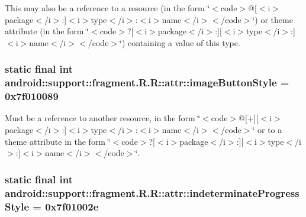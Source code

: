 This may also be a reference to a resource (in the form \char`\"{}$<$code$>$@\mbox{[}$<$i$>$package$<$/i$>$:\mbox{]}$<$i$>$type$<$/i$>$:$<$i$>$name$<$/i$>$$<$/code$>$\char`\"{}) or theme attribute (in the form \char`\"{}$<$code$>$?\mbox{[}$<$i$>$package$<$/i$>$:\mbox{]}\mbox{[}$<$i$>$type$<$/i$>$:\mbox{]}$<$i$>$name$<$/i$>$$<$/code$>$\char`\"{}) containing a value of this type. \hypertarget{classandroid_1_1support_1_1fragment_1_1_r_1_1attr_45008567ec4358acf7af16906e6ed9d3}{
\subsubsection[{imageButtonStyle}]{\setlength{\rightskip}{0pt plus 5cm}static final int android::support::fragment.R.R::attr::imageButtonStyle = 0x7f010089}}
\label{classandroid_1_1support_1_1fragment_1_1_r_1_1attr_45008567ec4358acf7af16906e6ed9d3}


Must be a reference to another resource, in the form \char`\"{}$<$code$>$@\mbox{[}+\mbox{]}\mbox{[}$<$i$>$package$<$/i$>$:\mbox{]}$<$i$>$type$<$/i$>$:$<$i$>$name$<$/i$>$$<$/code$>$\char`\"{} or to a theme attribute in the form \char`\"{}$<$code$>$?\mbox{[}$<$i$>$package$<$/i$>$:\mbox{]}\mbox{[}$<$i$>$type$<$/i$>$:\mbox{]}$<$i$>$name$<$/i$>$$<$/code$>$\char`\"{}. \hypertarget{classandroid_1_1support_1_1fragment_1_1_r_1_1attr_4c72c13c63b8c85282060dd60886b7ea}{
\subsubsection[{indeterminateProgressStyle}]{\setlength{\rightskip}{0pt plus 5cm}static final int android::support::fragment.R.R::attr::indeterminateProgressStyle = 0x7f01002e}}
\label{classandroid_1_1support_1_1fragment_1_1_r_1_1attr_4c72c13c63b8c85282060dd60886b7ea}


